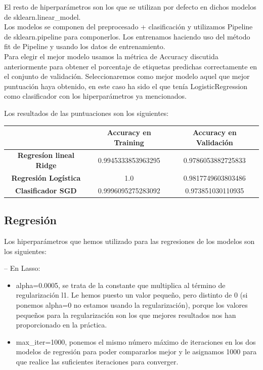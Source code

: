 \documentclass[12pt]{article}
\begin{document}
El resto de hiperparámetros son los que se utilizan por defecto en dichos modelos de sklearn.linear\_model. \\

Los modelos se componen del preprocesado + clasificación y utilizamos Pipeline de sklearn.pipeline para componerlos. Los entrenamos haciendo uso del método fit de Pipeline y usando los datos de entrenamiento.\\

Para elegir el mejor modelo usamos la métrica de Accuracy discutida anteriormente para obtener el porcentaje de etiquetas predichas correctamente en el conjunto de validación. Seleccionaremos como mejor modelo aquel que mejor puntuación haya obtenido, en este caso ha sido el que tenía LogisticRegression como clasificador con los hiperparámetros ya mencionados.

Los resultados de las puntuaciones son los siguientes:

\begin{table}[H]
\centering
\begin{tabular}{c|c|c|}
\cline{2-3}
                                                      & \textbf{Accuracy en Training} & \textbf{Accuracy en Validación} \\ \hline
\multicolumn{1}{|c|}{\textbf{Regresíon lineal Ridge}} & 0.9945333853963295            & 0.9786053882725833              \\ \hline
\multicolumn{1}{|c|}{\textbf{Regresión Logística}}    & 1.0                           & 0.9817749603803486              \\ \hline
\multicolumn{1}{|c|}{\textbf{Clasificador SGD}}       & 0.9996095275283092            & 0.973851030110935               \\ \hline
\end{tabular}
\end{table}

\subsection{Regresión}

Los hiperparámetros que hemos utilizado para las regresiones de los modelos son los siguientes:

-- En Lasso:
\begin{itemize}
		\item alpha=0.0005, se trata de la constante que multiplica al término de regularización l1. Le hemos puesto un valor pequeño, pero distinto de $0$ (si ponemos alpha=0 no estamos usando la regularización), porque los valores pequeños para la regularización son los que mejores resultados nos han proporcionado en la práctica.
        \item max\_iter=1000, ponemos el mismo número máximo de iteraciones en los dos modelos de regresión para poder compararlos mejor y le asignamos 1000 para que realice las suficientes iteraciones para converger.
\end{itemize}
\end{document}

